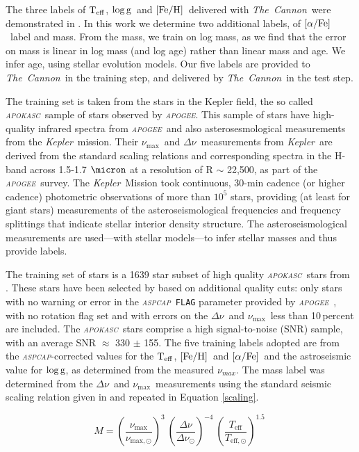 \documentclass[12pt, preprint]{aastex}
\newcommand{\project}[1]{\textsl{#1}}
\newcommand{\tc}{\project{The~Cannon}}
\newcommand{\apogee}{\project{\textsc{apogee}}}
\newcommand{\apokasc}{\project{\textsc{apokasc}}}
\newcommand{\aspcap}{\project{\textsc{aspcap}}}
\newcommand{\kepler}{\project{Kepler}}
\newcommand{\code}[1]{\texttt{#1}}
\newcommand{\teff}{\mbox{$\rm T_{eff}$}}
\newcommand{\feh}{\mbox{$\rm [Fe/H]$}}
\newcommand{\alphafe}{\mbox{$\rm [\alpha/Fe]$}}
\newcommand{\logg}{\mbox{$\rm \log g$}}
\newcommand{\numax}{$\nu_{\max}$}
\newcommand{\deltanu}{$\Delta\nu$}
\begin{document}
The three labels of \teff, \logg\ and \feh\ delivered with \tc\ were demonstrated in \citet{Ness2015}.  In this work we determine two additional labels, of \alphafe\ label and mass. From the mass, we train on log mass, as we find that the error on mass is linear in log mass (and log age) rather than linear mass and age. We infer age, using stellar evolution models. Our five labels are provided to \tc\ in the training step, and delivered by \tc\ in the test step.

 The training set is taken from the stars in the Kepler field, the so called \apokasc\ sample \citep{P2014}  of stars observed by \apogee.
This sample of stars have high-quality infrared
spectra from \apogee\ and also asterosesmological measurements from the \kepler\ mission.
Their \numax\ and \deltanu\ measurements from \kepler\ are derived from the standard scaling relations \citep[see][and references therein]{P2014} and corresponding spectra in the H-band across 1.5-1.7 $\micron$ at a resolution of R $\sim$ 22,500, as part of the \apogee\ survey. 
The \kepler\ Mission \citep{B2010} took continuous, 30-min cadence (or
higher cadence) photometric observations of more than $10^5$ stars,
providing (at least for giant stars) measurements of the
asteroseismological frequencies and frequency splittings that indicate
stellar interior density structure.
The asteroseismological measurements are used---with stellar
models---to infer stellar masses and thus provide labels.

The training set of stars is a 1639 star subset of high quality \apokasc\ stars from \citet{Martig2014}. These stars have been selected by \citet{Martig2014} based on additional quality cuts: only stars with no warning or error in the \aspcap\ \code{FLAG} parameter provided by \apogee\ \citep{Ahn2014}, with no rotation flag set and with errors on the \deltanu\ and \numax\ less than 10\,percent are included. The \apokasc\ stars comprise a high signal-to-noise (SNR) sample, with an average SNR $\approx$ 330 $\pm$ 155. 
%
 The five training labels adopted are from the \aspcap-corrected \citep{Meszaros2013} values for the \teff, \feh\ and \alphafe\ and the astroseismic value for \logg, as determined from the measured $\nu_{max}$. The mass label was determined from the  \deltanu\ and \numax\ measurements using the standard seismic scaling relation given in \citet{SilvaA2011,Chaplin2011} and repeated in Equation \ref{scaling}.

\begin{equation} \label{eq:mass}
M= \left( \frac{\nu_{\mathrm{max}}}{\nu_{\mathrm{max,\odot}}}\right)^3\  \left( \frac{\Delta \nu}{\Delta \nu_{\odot}}\right)^{-4} \ \left( \frac{T_{\mathrm{eff}}}{T_{\mathrm{eff,\odot}}}\right)^{1.5} \ 
\end{equation}
\label{scaling}
\end{document}
